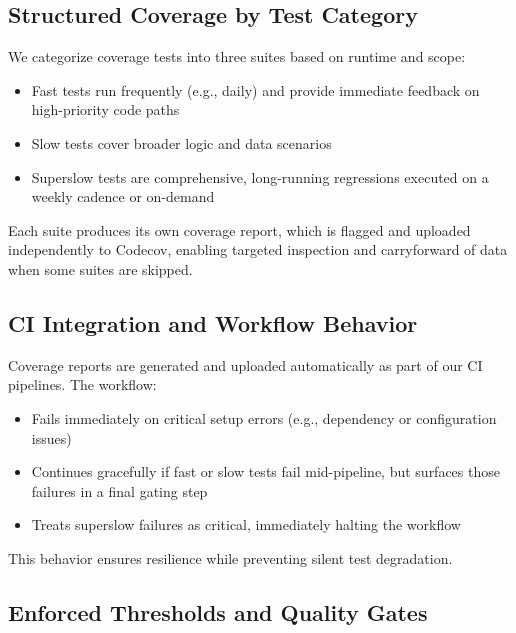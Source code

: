 \subsection{Structured Coverage by Test Category}

We categorize coverage tests into three suites based on runtime and
scope:

\begin{itemize}
  \item Fast tests run frequently (e.g., daily) and provide immediate feedback
    on high-priority code paths

  \item Slow tests cover broader logic and data scenarios

  \item Superslow tests are comprehensive, long-running regressions
    executed on a weekly cadence or on-demand
\end{itemize}

Each suite produces its own coverage report, which is flagged and
uploaded independently to Codecov, enabling targeted inspection and carryforward
of data when some suites are skipped.

\subsection{CI Integration and Workflow Behavior}

Coverage reports are generated and uploaded automatically as part of our
CI pipelines. The workflow:

\begin{itemize}
  \item Fails immediately on critical setup errors (e.g., dependency or
    configuration issues)

  \item Continues gracefully if fast or slow tests fail mid-pipeline,
    but surfaces those failures in a final gating step

  \item Treats superslow failures as critical, immediately halting the
    workflow
\end{itemize}

This behavior ensures resilience while preventing silent test
degradation.

\subsection{Enforced Thresholds and Quality Gates}

